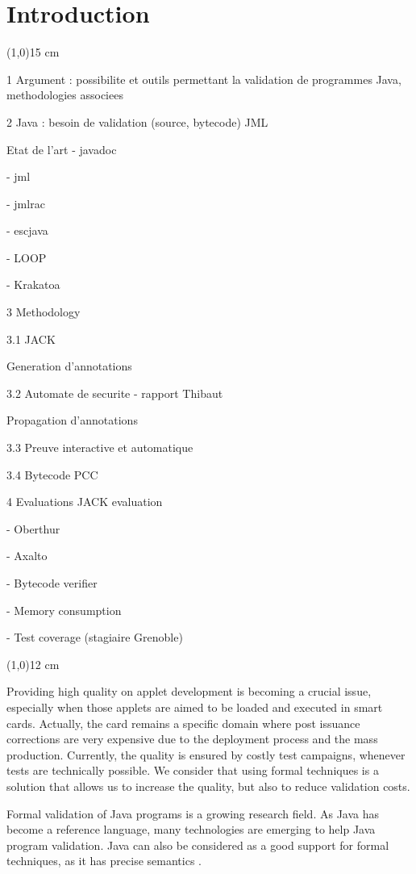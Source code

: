 \chapter{Introduction}

\line(1,0){15 cm}

1 Argument : possibilite et outils permettant la validation de programmes Java, methodologies associees

2 Java : besoin de validation (source, bytecode)
  JML

Etat de l'art
- javadoc

- jml

- jmlrac

- escjava

- LOOP

- Krakatoa

3 Methodology

3.1 JACK

    Generation d'annotations

3.2 Automate de securite - rapport Thibaut

    Propagation d'annotations

3.3 Preuve interactive et automatique

3.4 Bytecode PCC

4 Evaluations
JACK evaluation 

	- Oberthur

	- Axalto

	- Bytecode verifier

	- Memory consumption

        - Test coverage (stagiaire Grenoble)

\line(1,0){12 cm}

Providing high quality on applet development is becoming a crucial
issue, especially when those applets are aimed to be loaded and executed in smart cards.  Actually, the card
remains a specific domain where post issuance corrections are very expensive due to the deployment process and
the mass production. Currently, the quality is ensured by costly test campaigns, whenever tests are technically
possible. We consider that using formal techniques is a solution that allows us to increase the quality, but
also to reduce validation costs.

 Formal validation of Java programs is a growing research
 field.  As Java has become a reference language, many technologies are
 emerging to help Java program validation.  Java can also be
 considered as a good support for formal techniques, as it has precise semantics \cite{Gosl00a}.

